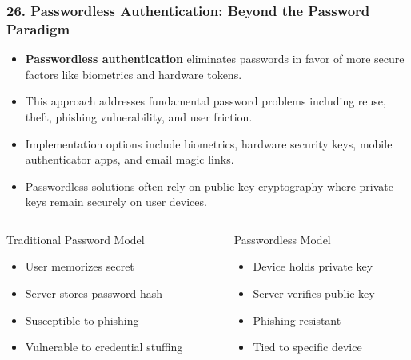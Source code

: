 \documentclass{beamer}
\begin{document}
		\begin{frame}
			\frametitle{26. Passwordless Authentication: Beyond the Password Paradigm}
			\begin{itemize}
				\item \textbf{Passwordless authentication} eliminates passwords in favor of more secure factors like biometrics and hardware tokens.
				\item This approach addresses fundamental password problems including reuse, theft, phishing vulnerability, and user friction.
				\item Implementation options include biometrics, hardware security keys, mobile authenticator apps, and email magic links.
				\item Passwordless solutions often rely on public-key cryptography where private keys remain securely on user devices.
			\end{itemize}
	\begin{columns}
		\scriptsize
		\begin{column}{0.48\textwidth}
			\begin{block}{Traditional Password Model}
				\begin{itemize}
					\item User memorizes secret
					\item Server stores password hash
					\item Susceptible to phishing
					\item Vulnerable to credential stuffing
				\end{itemize}
			\end{block}
		\end{column}
		\begin{column}{0.48\textwidth}
			\begin{block}{Passwordless Model}
				\begin{itemize}
					\item Device holds private key
					\item Server verifies public key
					\item Phishing resistant
					\item Tied to specific device
				\end{itemize}
			\end{block}
		\end{column}
	\end{columns}
		\end{frame}
		
\end{document}
